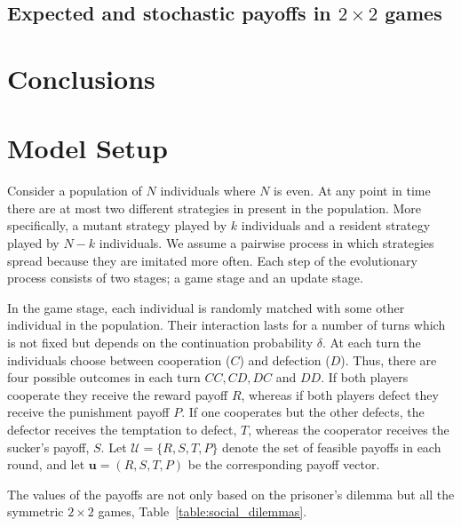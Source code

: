 \documentclass[11pt]{article}
\theoremstyle{plainCl1}
\theoremstyle{plainCl2}
\begin{document}
\subsection{Expected and stochastic payoffs in $2 \times 2$ games}\label{section:2_by_2_games}

\section{Conclusions}\label{section:conclusions}

\appendix

\section{Model Setup}\label{appendix:methods}

Consider a population of \(N\) individuals where \(N\) is even. At any point in
time there are at most two different strategies in present in the population.
More specifically, a mutant strategy played by \(k\) individuals and a resident
strategy played by \(N - k\) individuals. We assume a pairwise process in which
strategies spread because they are imitated more often. Each step of the
evolutionary process consists of two stages; a game stage and an update stage.

In the game stage, each individual is randomly matched with some other
individual in the population. Their interaction lasts for a number of turns
which is not fixed but depends on the continuation probability \(\delta\). At
each turn the individuals choose between cooperation (\(C\)) and defection
(\(D\)). Thus, there are four possible outcomes in each turn \(CC, CD, DC\) and
\(DD\). If both players cooperate they receive the reward payoff \(R\), whereas
if both players defect they receive the punishment payoff \(P\). If one
cooperates but the other defects, the defector receives the temptation to
defect, \(T\), whereas the cooperator receives the sucker's payoff, \(S\).
Let $\mathcal{U}=\{R,S,T,P\}$ denote the set of feasible payoffs in each round,
and let $\mathbf{u}\!=\!(R,S,T,P)$ be the corresponding payoff vector.

The values of the payoffs are not only based on the prisoner's dilemma but all
the symmetric \(2 \times 2\) games, Table~\ref{table:social_dilemmas}.
\end{document}
